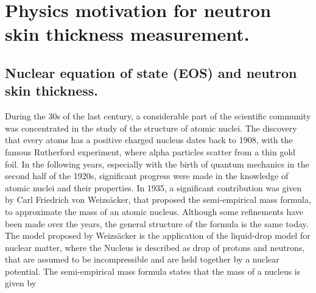 
\chapter{Physics motivation for neutron skin thickness measurement.} \label{intro}

\section{Nuclear equation of state (EOS) and neutron skin thickness.}


During the 30s of the last century, a considerable part of the scientific community was concentrated in the study of the structure of atomic nuclei. The discovery that every atoms has a positive charged nucleus dates back to 1908, with the famous Rutherford experiment, where alpha particles scatter from a thin gold foil. In the following years, especially with the birth of quantum mechanics in the second half of the 1920s, significant progress were made in the knowledge of atomic nuclei and their properties. In 1935, a significant contribution was given by Carl Friedrich von Weizsäcker, that proposed the semi-empirical mass formula, to approximate the mass of an atomic nucleus. Although some refinements have been made over the years, the general structure of the formula is the same today. 
The model proposed by Weizsäcker is the application of the liquid-drop model for nuclear matter, where the Nucleus is described as drop of protons and neutrons, that are assumed to be incompressible and are held together by a nuclear potential. The semi-empirical mass formula states that the mass of a nucleus is given by 


